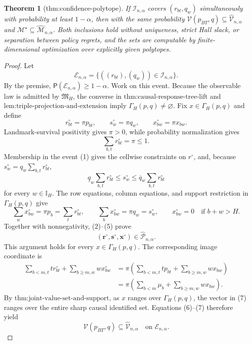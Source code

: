 \documentclass{article}
\newtheorem{theorem}{Theorem}
\begin{document}
\begin{theorem}[thm:confidence-polytope]\label{thm:confidence-polytope}
If \(\mathcal I_{n,\alpha}\) covers \((r_{bt},q_w)\) simultaneously with probability at least \(1-\alpha\), then with the same probability \(\mathcal V(p_{BT},q)\subseteq\widehat{\mathcal V}_{n,\alpha}\) and \(\mathcal M^\star\subseteq\widehat{\mathcal M}_{n,\alpha}\). Both inclusions hold without uniqueness, strict Hall slack, or separation between policy regrets, and the sets are computable by finite-dimensional optimization over explicitly given polytopes.
\end{theorem}
\begin{proof}
Let
\[
 \mathcal E_{n,\alpha}
 =\{((r_{bt}),(q_w))\in\mathcal I_{n,\alpha}\}.             \tag{1}
\]
By the premise, \(\mathsf P(\mathcal E_{n,\alpha})\ge 1-\alpha\).  Work on this event.  Because the observable law is admitted by \(\mathfrak M_H\), the converse in \(\text{thm:causal-response-tree-lift}\) and \(\text{lem:triple-projection-and-extension}\) imply \(\Gamma_H(p,q)\ne\varnothing\).  Fix \(x\in\Gamma_H(p,q)\) and define
\[
 r^\circ_{bt}=\pi p_{bt},\qquad
 s^\circ_w=\pi q_w,\qquad
 x^\circ_{bw}=\pi x_{bw}.                                \tag{2}
\]
Landmark-survival positivity gives \(\pi>0\), while probability normalization gives
\[
 \sum_{b,t}r^\circ_{bt}=\pi\le 1.                         \tag{3}
\]
Membership in the event (1) gives the cellwise constraints on \(r^\circ\), and, because \(s^\circ_w=q_w\sum_{b,t}r^\circ_{bt}\),
\[
 \underline q_w\sum_{b,t}r^\circ_{bt}
 \le s^\circ_w
 \le \overline q_w\sum_{b,t}r^\circ_{bt}                 \tag{4}
\]
for every \(w\in\mathbb I_H\).  The row equations, column equations, and support restriction in \(\Gamma_H(p,q)\) give
\[
 \sum_wx^\circ_{bw}=\pi p_b=\sum_t r^\circ_{bt},\qquad
 \sum_bx^\circ_{bw}=\pi q_w=s^\circ_w,\qquad
 x^\circ_{bw}=0\quad\text{if }b+w>H.                    \tag{5}
\]
Together with nonnegativity, (2)--(5) prove
\[
 (\mathbf r^\circ,\mathbf s^\circ,\mathbf x^\circ)
 \in\widehat{\mathcal P}_{n,\alpha}.                    \tag{6}
\]
This argument holds for every \(x\in\Gamma_H(p,q)\).  The corresponding image coordinate is
\[
 \begin{aligned}
 \sum_{b<m,t}t r^\circ_{bt}+\sum_{b\ge m,w}w x^\circ_{bw}
 &=\pi\left(\sum_{b<m,t}t p_{bt}+\sum_{b\ge m,w}w x_{bw}\right)\\
 &=\pi\left(\sum_{b<m}\mu_b+\sum_{b\ge m,w}w x_{bw}\right).
 \end{aligned}                                            \tag{7}
\]
By \(\text{thm:joint-value-set-and-support}\), as \(x\) ranges over \(\Gamma_H(p,q)\), the vector in (7) ranges over the entire sharp causal identified set.  Equations (6)--(7) therefore yield
\[
 \mathcal V(p_{BT},q)\subseteq\widehat{\mathcal V}_{n,\alpha}
 \quad\text{on }\mathcal E_{n,\alpha}.                  \tag{8}
\]


\end{proof}
\end{document}
